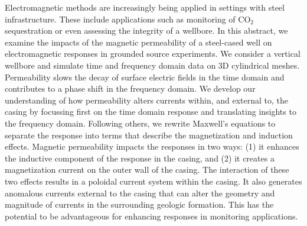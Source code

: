 Electromagnetic methods are increasingly being applied in settings with steel infrastructure. These include applications such as monitoring of CO$_2$ sequestration or even assessing the integrity of a wellbore. In this abstract, we examine the impacts of the magnetic permeability of a steel-cased well on electromagnetic responses in grounded source experiments. We consider a vertical wellbore and simulate time and frequency domain data on 3D cylindrical meshes. Permeability slows the decay of surface electric fields in the time domain and contributes to a phase shift in the frequency domain. We develop our understanding of how permeability alters currents within, and external to, the casing by focussing first on the time domain response and translating insights to the frequency domain. Following others, we rewrite Maxwell's equations to separate the response into terms that describe the magnetization and induction effects. Magnetic permeability impacts the responses in two ways: (1) it enhances the inductive component of the response in the casing, and (2) it creates a magnetization current on the outer wall of the casing. The interaction of these two effects results in a poloidal current system within the casing. It also generates anomalous currents external to the casing that can alter the geometry and magnitude of currents in the surrounding geologic formation. This has the potential to be advantageous for enhancing responses in monitoring applications.
